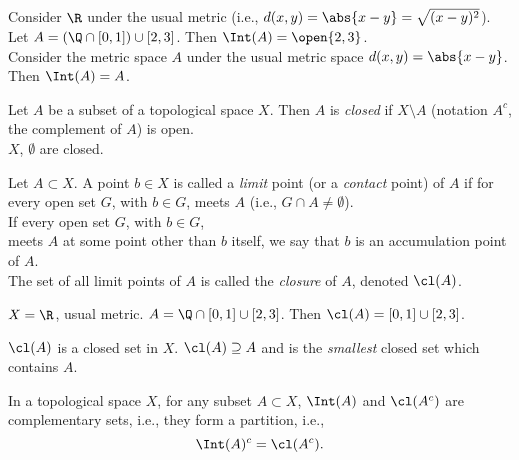 \eg Consider $\R$ under the usual metric (i.e., $d(x,y)=\abs{x-y}=\sqrt{(x-y)^2}$).  Let $A=(\Q\cap[0,1])\cup[2,3]$.  Then $\Int(A)=\open{2,3}$. \\
Consider the metric space $A$ under the usual metric space $d(x,y)=\abs{x-y}$. \\
Then $\Int(A)=A$.

 Let $A$ be a subset of a topological space $X$.  Then $A$ is \emph{closed} if $X\setminus A$ (notation $A^c$, the complement of $A$) is open. \\
\eg $X$, $\emptyset$ are closed.

Let $A\subset X$.  A point $b\in X$ is called a \emph{limit} point (or a \emph{contact} point) of $A$ if for every open set $G$, with $b\in G$, meets $A$ (i.e., $G\cap A\neq\emptyset$). \\
If every open set $G$, with $b\in G$, \\
meets $A$ at some point other than $b$ itself, we say that $b$ is an accumulation point of $A$. \\
The set of all limit points of $A$ is called the \emph{closure} of $A$, denoted $\cl(A)$.

\eg $X=\R$, usual metric.  $A=\Q\cap[0,1]\cup[2,3]$.  Then $\cl(A)=[0,1]\cup[2,3]$.

\prop $\cl(A)$ is a closed set in $X$.  $\cl(A)\supseteq A$ and is the \emph{smallest} closed set which contains $A$.

\prop {}%
In a topological space $X$, for any subset $A\subset X$, $\Int(A)$ and $\cl(A^c)$ are complementary sets, i.e., they form a partition, i.e.,
\[ \Int(A)^c = \cl(A^c) . \]
